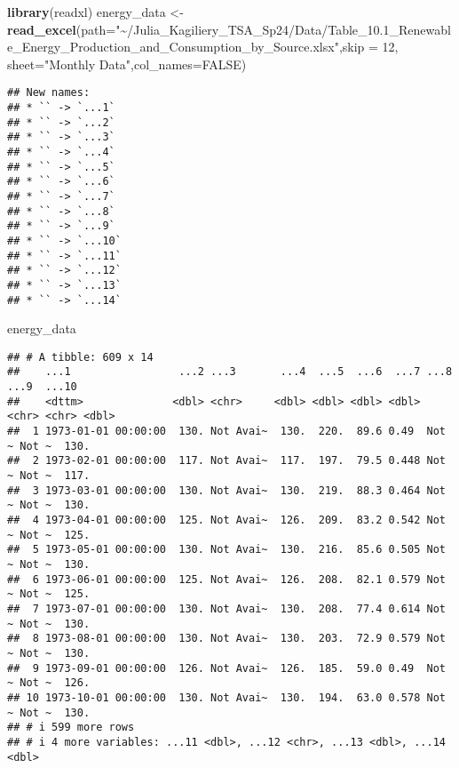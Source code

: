 \documentclass[
]{article}
\newenvironment{Shaded}{\begin{snugshade}}{\end{snugshade}}
\newcommand{\AttributeTok}[1]{\textcolor[rgb]{0.13,0.29,0.53}{#1}}
\newcommand{\ConstantTok}[1]{\textcolor[rgb]{0.56,0.35,0.01}{#1}}
\newcommand{\DecValTok}[1]{\textcolor[rgb]{0.00,0.00,0.81}{#1}}
\newcommand{\FunctionTok}[1]{\textcolor[rgb]{0.13,0.29,0.53}{\textbf{#1}}}
\newcommand{\NormalTok}[1]{#1}
\newcommand{\OtherTok}[1]{\textcolor[rgb]{0.56,0.35,0.01}{#1}}
\newcommand{\StringTok}[1]{\textcolor[rgb]{0.31,0.60,0.02}{#1}}
\begin{document}
\begin{Shaded}
\begin{Highlighting}[]
\FunctionTok{library}\NormalTok{(readxl)}
\NormalTok{energy\_data }\OtherTok{\textless{}{-}} \FunctionTok{read\_excel}\NormalTok{(}\AttributeTok{path=}\StringTok{"\textasciitilde{}/Julia\_Kagiliery\_TSA\_Sp24/Data/Table\_10.1\_Renewable\_Energy\_Production\_and\_Consumption\_by\_Source.xlsx"}\NormalTok{,}\AttributeTok{skip =} \DecValTok{12}\NormalTok{, }\AttributeTok{sheet=}\StringTok{"Monthly Data"}\NormalTok{,}\AttributeTok{col\_names=}\ConstantTok{FALSE}\NormalTok{) }
\end{Highlighting}
\end{Shaded}

\begin{verbatim}
## New names:
## * `` -> `...1`
## * `` -> `...2`
## * `` -> `...3`
## * `` -> `...4`
## * `` -> `...5`
## * `` -> `...6`
## * `` -> `...7`
## * `` -> `...8`
## * `` -> `...9`
## * `` -> `...10`
## * `` -> `...11`
## * `` -> `...12`
## * `` -> `...13`
## * `` -> `...14`
\end{verbatim}

\begin{Shaded}
\begin{Highlighting}[]
\NormalTok{energy\_data}
\end{Highlighting}
\end{Shaded}

\begin{verbatim}
## # A tibble: 609 x 14
##    ...1                 ...2 ...3       ...4  ...5  ...6  ...7 ...8  ...9  ...10
##    <dttm>              <dbl> <chr>     <dbl> <dbl> <dbl> <dbl> <chr> <chr> <dbl>
##  1 1973-01-01 00:00:00  130. Not Avai~  130.  220.  89.6 0.49  Not ~ Not ~  130.
##  2 1973-02-01 00:00:00  117. Not Avai~  117.  197.  79.5 0.448 Not ~ Not ~  117.
##  3 1973-03-01 00:00:00  130. Not Avai~  130.  219.  88.3 0.464 Not ~ Not ~  130.
##  4 1973-04-01 00:00:00  125. Not Avai~  126.  209.  83.2 0.542 Not ~ Not ~  125.
##  5 1973-05-01 00:00:00  130. Not Avai~  130.  216.  85.6 0.505 Not ~ Not ~  130.
##  6 1973-06-01 00:00:00  125. Not Avai~  126.  208.  82.1 0.579 Not ~ Not ~  125.
##  7 1973-07-01 00:00:00  130. Not Avai~  130.  208.  77.4 0.614 Not ~ Not ~  130.
##  8 1973-08-01 00:00:00  130. Not Avai~  130.  203.  72.9 0.579 Not ~ Not ~  130.
##  9 1973-09-01 00:00:00  126. Not Avai~  126.  185.  59.0 0.49  Not ~ Not ~  126.
## 10 1973-10-01 00:00:00  130. Not Avai~  130.  194.  63.0 0.578 Not ~ Not ~  130.
## # i 599 more rows
## # i 4 more variables: ...11 <dbl>, ...12 <chr>, ...13 <dbl>, ...14 <dbl>
\end{verbatim}
\end{document}
